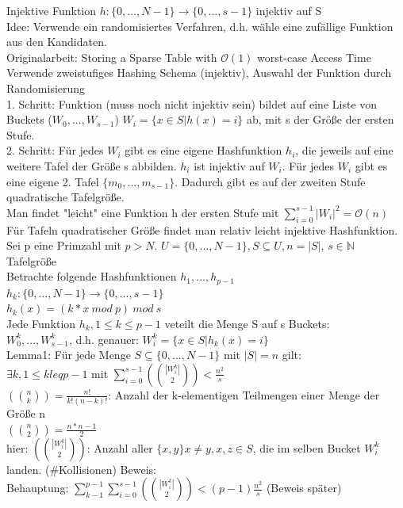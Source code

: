 \documentclass[a4paper]{article}
\newcommand{\oh}[1]{$\mathcal{O}(#1)$}
\begin{document}
Injektive Funktion $h:\{0,...,N-1\} \rightarrow \{0,...,s-1\}$ injektiv auf S\\
Idee: Verwende ein randomisiertes Verfahren, d.h. wähle eine zufällige Funktion aus den Kandidaten.\\
Originalarbeit: Storing a Sparse Table with \oh{1} worst-case Access Time\\
Verwende zweistufiges Hashing Schema (injektiv), Auswahl der Funktion durch Randomisierung\\
1. Schritt: Funktion (muss noch nicht injektiv sein) bildet auf eine Liste von Buckets ($W_0,...,W_{s-1}$) $W_i=\{x\in S | h(x)=i\}$ ab, mit s der Größe der ersten Stufe.\\
2. Schritt: Für jedes $W_i$ gibt es eine eigene Hashfunktion $h_i$, die jeweils auf eine weitere Tafel der Größe s abbilden. $h_i$ ist injektiv auf $W_i$. Für jedes $W_i$ gibt es eine eigene 2. Tafel $\{m_0,...,m_{s-1}\}$. Dadurch gibt es auf der zweiten Stufe quadratische Tafelgröße.\\
Man findet "leicht" eine Funktion h der ersten Stufe mit $\sum_{i=0}^{s-1} |W_i|^2 = $\oh{n}\\
Für Tafeln quadratischer Größe findet man relativ leicht injektive Hashfunktion.
Sei p eine Primzahl mit $p>N$. $U=\{0,...,N-1\}, S\subseteq U,n=|S|$, $s\in\mathbb{N}$ Tafelgröße\\
Betrachte folgende Hashfunktionen $h_1,...,h_{p-1}$\\
$h_k:\{0,...,N-1\} \rightarrow \{0,...,s-1\}$\\
$h_k(x) = (k*x\ mod\ p)\ mod\ s$\\
Jede Funktion $h_k, 1\leq k\leq p-1$ veteilt die Menge S auf s Buckets:\\
$W_0^k,...,W_{s-1}^k$, d.h. genauer: $W_i^k = \{x\in S|h_k(x)=i\}$\\
Lemma1: Für jede Menge $S\subseteq \{0,...,N-1\}$ mit $|S|=n$ gilt:\\
$\exists k, 1\leq kleq p-1$ mit $\sum_{i=0}^{s-1}({|W_i^k| \choose 2})<\frac{n^2}{s}$\\
$({n \choose k}) = \frac{n!}{k!(n-k)!}$: Anzahl der k-elementigen Teilmengen einer Menge der Größe n\\
$({n \choose 2}) = \frac{n*n-1}{2}$\\
hier: $({|W_i^k| \choose 2})$: Anzahl aller $\{x,y\} x\neq y, x,z\in S$, die im selben Bucket $W_i^k$ landen. (\#Kollisionen)
Beweis:\\
Behauptung: $\sum_{k-1}^{p-1}\sum_{i=0}^{s-1}({|W_i^k| \choose 2}) < (p-1)\frac{n^2}{s}$ (Beweis später)\\
\end{document}
